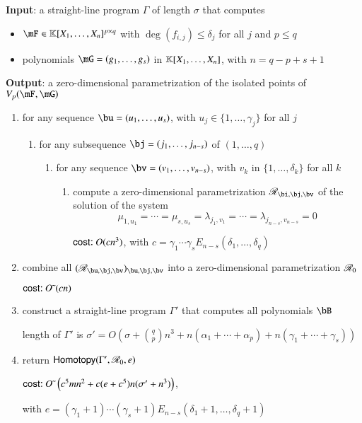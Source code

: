 \documentclass[amsthm]{elsart}
\begin{document}
\begin{algorithm}[h]
\caption{$\mathsf{ColumnDegree}(\Gamma)$}
{\bf Input}: a straight-line program $\Gamma$ of length $\sigma$ that computes 
\begin{itemize}  
\setlength\itemsep{0em}
\item $\mF \in \KK[X_1, \ldots, X_n]^{p \times q}$ with $\deg(f_{i,j}) \leq \delta_j$ for all $j$ and $p \le q$
\item polynomials $\mG = (g_1, \ldots, g_s)$ in $\mathbb{K}[X_1, \ldots, X_n]$, with $n=q-p+s+1$
\end{itemize}
{\bf Output}: a zero-dimensional parametrization of the isolated points of $\VpFG{p}{\mF}{\mG}$
\begin{enumerate}\setlength\itemsep{0em}
\item for any sequence $\bu=(u_1,\dots,u_s)$, with $u_j \in \{1,\dots,\gamma_j\}$ for all $j$
\begin{enumerate}\setlength\itemsep{0em}
\item for any subsequence $\bj=(j_1,\dots,j_{n-s})$ of $(1,\dots,q)$
\begin{enumerate}\setlength\itemsep{0em}
\item for any sequence $\bv=(v_1,\dots,v_{n-s})$, with $v_k$ in $\{1,\dots,\delta_k\}$ for all $k$
\begin{enumerate}\setlength\itemsep{0em}
 \item compute a zero-dimensional parametrization $\scrR_{\bi,\bj,\bv}$ of the solution of the system 
$$\mu_{1,u_1}=\cdots=\mu_{s,u_s}=\lambda_{j_1,v_1}=\cdots=\lambda_{j_{n-s},v_{n-s}}=0$$

\hfill $\text{\sf{cost:~}} O(cn^3)$, with $c=\gamma_1\cdots\gamma_s E_{n-s}(\delta_1,\dots,\delta_q)$
\end{enumerate}
\end{enumerate}
\end{enumerate}
\item combine all $(\scrR_{\bu,\bj,\bv})_{\bu,\bj,\bv}$ into a zero-dimensional parametrization $\mathscr{R}_0$

  \hfill $\text{\sf{cost:~}} {O}{\,\tilde{ }\,}(cn)$

\item construct a straight-line program $\Gamma'$ that computes all polynomials $\bB$

\hfill length of $\Gamma'$ is $\sigma'=O(\sigma + {q \choose p} n^3 + n
(\alpha_1+\cdots+\alpha_p) + n(\gamma_1 + \cdots + \gamma_s))$

\item return $\mathsf{Homotopy}(\Gamma',\mathscr{R}_0,e)$ 

\hfill $\text{\sf{cost:~}} {O}{\,\tilde{ }\,}\left (c^5 m n^2 + c(e+c^5)n (\sigma' + n^3)\right)$, 

\hfill with $e=(\gamma_1+1)\cdots(\gamma_s+1) E_{n-s}(\delta_1+1,\dots,\delta_q+1)$
\end{enumerate}
\label{ColHom}
\end{algorithm}
\end{document}
